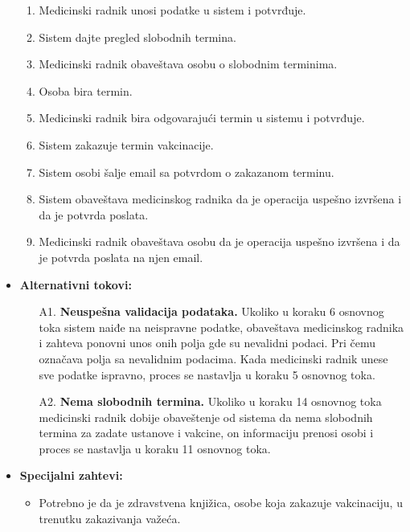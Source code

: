 \documentclass[titlepage]{article}
\begin{document}
\begin{itemize}
\begin{enumerate}
	    \item Medicinski radnik unosi podatke u sistem i potvrđuje.
	    \item Sistem dajte pregled slobodnih termina.
            \item Medicinski radnik obaveštava osobu o slobodnim terminima.
	    \item Osoba bira termin.
	    \item Medicinski radnik bira odgovarajući termin u sistemu i potvrđuje.
            \item Sistem zakazuje termin vakcinacije.
	    \item Sistem osobi šalje email sa potvrdom o zakazanom terminu.
            \item Sistem obaveštava medicinskog radnika da je operacija uspešno izvršena i da je potvrda poslata.
	    \item Medicinski radnik obaveštava osobu da je operacija uspešno izvršena i da je potvrda poslata na njen email.
	\end{enumerate}
     
    
    \item \textbf{Alternativni tokovi:}
        \begin{itemize}
            \item[A1.] \textbf{Neuspešna validacija podataka.} Ukoliko u koraku 6 osnovnog toka sistem naiđe na neispravne podatke, obaveštava medicinskog radnika i zahteva ponovni unos onih polja gde su nevalidni podaci. Pri čemu označava polja sa nevalidnim podacima. Kada medicinski radnik unese sve podatke ispravno, proces se nastavlja u koraku 5 osnovnog toka.
	     \item[A2.] \textbf{Nema slobodnih termina.} Ukoliko u koraku 14 osnovnog toka medicinski radnik dobije obaveštenje od sistema da nema slobodnih termina za zadate ustanove i vakcine, on informaciju prenosi osobi i proces se nastavlja u koraku 11 osnovnog toka.
        \end{itemize}
    
    \item \textbf{Specijalni zahtevi:}
		\begin{itemize}
			\item Potrebno je da je zdravstvena knjižica, osobe koja zakazuje vakcinaciju, u trenutku zakazivanja važeća.
		\end{itemize}



\end{itemize}
\end{document}
